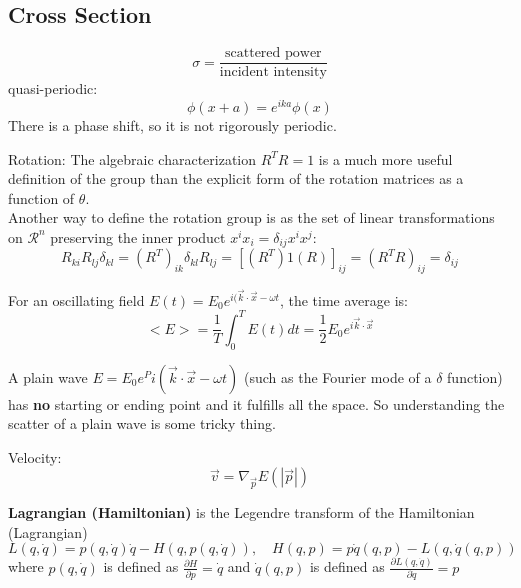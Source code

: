 \subsection{Cross Section}
\begin{equation}
    \label{eqn:xsection}
    \sigma = \frac{\text{scattered power}}{\text{incident intensity}}
\end{equation}
quasi-periodic:
\begin{equation}
    \label{quasi-periodic}
    \phi(x+a) = e^{ika}\phi(x)
\end{equation}
There is a phase shift, so it is not rigorously periodic.


Rotation:
The algebraic characterization $R^TR=\mathcal{1}$ is a much more useful
definition of the group than the explicit form of the rotation matrices 
as a function of $\theta$.  \\
Another way to define the rotation group is as the set of linear 
transformations on $\mathcal{R}^n$ preserving the inner product 
$x^ix_i=\delta_{ij}x^ix^j$:
\begin{equation}
    \label{eqn:rotation}
    R_{ki}R_{lj}\delta_{kl} = (R^T)_{ik}\delta_{kl}R_{lj} = [(R^T)\mathcal{1}(R)]_{ij} = (R^TR)_{ij}=\delta_{ij}
\end{equation}


For an oscillating field $E(t) = E_0 e^{i(\vec{k}\cdot\vec{x}-\omega t}$, the time average is:
\begin{equation}
    <E> = \frac{1}{T}\int_0^TE(t)dt = \frac{1}{2}E_0e^{i\vec{k}\cdot\vec{x}}
\end{equation}

A plain wave $E = E_0 e^Pi(\vec{k}\cdot\vec{x}-\omega t)$ (such as the 
Fourier mode of a $\delta$ function) has \textbf{no} starting or ending 
point and it fulfills all the space. So understanding the scatter of a 
plain wave is some tricky thing.

Velocity: 
\begin{equation}
    \vec{v} = \nabla_{\vec{p}}E(|\vec{p}|)
\end{equation}

\textbf{Lagrangian (Hamiltonian)} is the Legendre transform of the Hamiltonian (Lagrangian)
\begin{equation}
    L(q, \dot{q}) = p(q, \dot{q})\dot{q} - H(q,p(q, \dot{q})), \quad 
    H(q, p) = p\dot{q}(q,p) - L(q,\dot{q}(q,p))
\end{equation}
where $p(q, \dot{q})$ is defined as $\frac{\partial H}{\partial p} = \dot{q}$
and $\dot{q}(q,p)$ is defined as $\frac{\partial L(q,\dot{q})}{\partial \dot{q}}=p$


